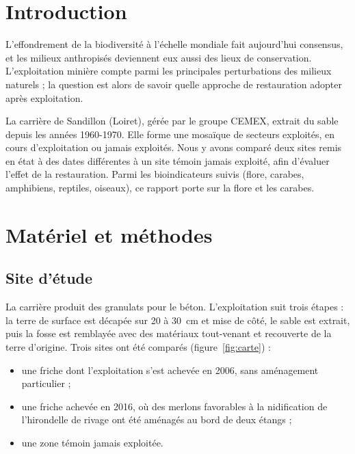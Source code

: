 \documentclass[11pt,a4paper]{article}
\begin{document}
\pagedegarde


\section{Introduction}
L'effondrement de la biodiversité à l'échelle mondiale fait aujourd'hui consensus, et les milieux anthropisés deviennent eux aussi des lieux de conservation. L'exploitation minière compte parmi les principales perturbations des milieux naturels \parencite{pitz2018} ; la question est alors de savoir quelle approche de restauration adopter après exploitation.

La carrière de Sandillon (Loiret), gérée par le groupe CEMEX, extrait du sable depuis les années 1960-1970. Elle forme une mosaïque de secteurs exploités, en cours d'exploitation ou jamais exploités. Nous y avons comparé deux sites remis en état à des dates différentes à un site témoin jamais exploité, afin d'évaluer l'effet de la restauration. Parmi les bioindicateurs suivis (flore, carabes, amphibiens, reptiles, oiseaux), ce rapport porte sur la flore et les carabes.

\section{Matériel et méthodes}
\subsection{Site d'étude}
La carrière produit des granulats pour le béton. L'exploitation suit trois étapes : la terre de surface est décapée sur 20 à 30~cm et mise de côté, le sable est extrait, puis la fosse est remblayée avec des matériaux tout-venant et recouverte de la terre d'origine. Trois sites ont été comparés (figure~\ref{fig:carte}) :
\begin{itemize}
\item une friche dont l'exploitation s'est achevée en 2006, sans aménagement particulier ;
\item une friche achevée en 2016, où des merlons favorables à la nidification de l'hirondelle de rivage ont été aménagés au bord de deux étangs ;
\item une zone témoin jamais exploitée.
\end{itemize}
\end{document}

